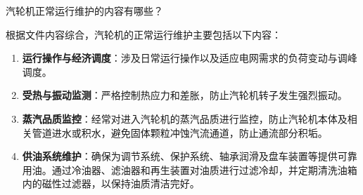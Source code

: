 \begin{problem}
汽轮机正常运行维护的内容有哪些？
\end{problem}

\begin{solution}
根据文件内容综合，汽轮机的正常运行维护主要包括以下内容：
\begin{enumerate}
  \item \textbf{运行操作与经济调度}：涉及日常运行操作以及适应电网需求的负荷变动与调峰调度。
  \item \textbf{受热与振动监测}：严格控制热应力和差胀，防止汽轮机转子发生强烈振动。
  \item \textbf{蒸汽品质监控}：经常对进入汽轮机的蒸汽品质进行监控，防止汽轮机本体及相关管道进水或积水，避免固体颗粒冲蚀汽流通道，防止通流部分积垢。
  \item \textbf{供油系统维护}：确保为调节系统、保护系统、轴承润滑及盘车装置等提供可靠用油。通过冷油器、滤油器和再生装置对油质进行过滤冷却，并定期清洗油箱内的磁性过滤器，以保持油质清洁完好。
\end{enumerate}
\end{solution}
